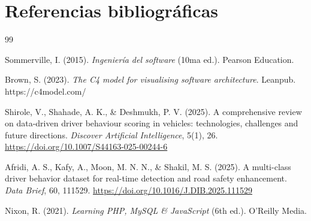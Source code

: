 \documentclass[12pt]{article}
\begin{document}
\section{Referencias bibliográficas}
\begin{thebibliography}{99}

Sommerville, I. (2015). \textit{Ingeniería del software} (10ma ed.). Pearson Education.

Brown, S. (2023). \textit{The C4 model for visualising software architecture}. Leanpub. https://c4model.com/

Shirole, V., Shahade, A. K., \& Deshmukh, P. V. (2025). A comprehensive review on data-driven driver behaviour scoring in vehicles: technologies, challenges and future directions. \textit{Discover Artificial Intelligence}, 5(1), 26. \url{https://doi.org/10.1007/S44163-025-00244-6}

Afridi, A. S., Kafy, A., Moon, M. N. N., \& Shakil, M. S. (2025). A multi-class driver behavior dataset for real-time detection and road safety enhancement. \textit{Data Brief}, 60, 111529. \url{https://doi.org/10.1016/J.DIB.2025.111529}

Nixon, R. (2021). \textit{Learning PHP, MySQL \& JavaScript} (6th ed.). O'Reilly Media.


\end{thebibliography}
\end{document}
